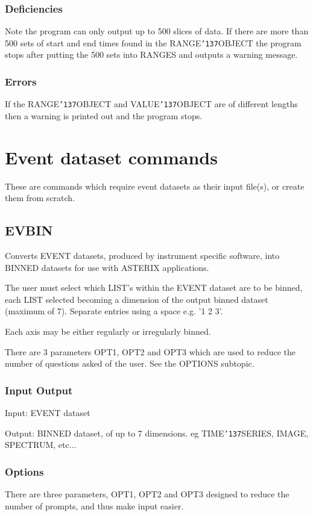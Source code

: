 \documentclass{book}
\renewcommand{\_}{{\tt\char'137}}     %
\begin{document}
\subsection{Deficiencies}
Note the program can only output up to 500 slices of data. If
there are more than 500 sets of start and end times found in the
RANGE\_OBJECT the program stops after putting the 500 sets into
RANGES and outputs a warning message.

\subsection{Errors}
If the RANGE\_OBJECT and VALUE\_OBJECT are of different lengths
then a warning is printed out and the program stops.

\chapter{Event dataset commands}
These are commands which require event datasets as their input
file(s), or create them from scratch.

\section{EVBIN}
Converts EVENT datasets, produced by instrument specific
software, into BINNED datasets for use with ASTERIX applications.

The user must select which LIST's within the EVENT dataset are to
be binned, each LIST selected becoming a dimension of the output
binned dataset (maximum of 7). Separate entries using a space
e.g. '1 2 3'.

Each axis may be either regularly or irregularly binned.

There are 3 parameters OPT1, OPT2 and OPT3 which are used to reduce
the number of questions asked of the user. See the OPTIONS
subtopic.

\subsection{Input Output}
Input: EVENT dataset

Output: BINNED dataset, of up to 7 dimensions.
eg TIME\_SERIES, IMAGE, SPECTRUM, etc...

\subsection{Options}
There are three parameters, OPT1, OPT2 and OPT3 designed to reduce
the number of prompts, and thus make input easier.
\end{document}
